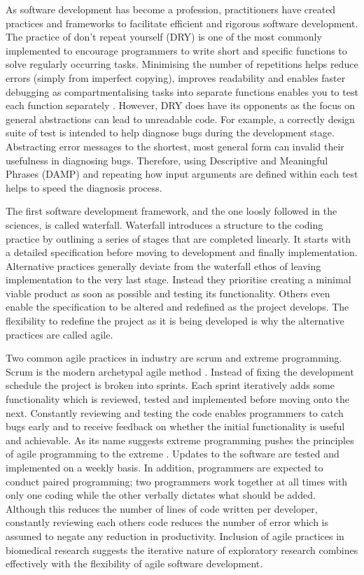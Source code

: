 \documentclass[../main.tex]{subfiles}
\begin{document}

As software development has become a profession, practitioners have created practices and frameworks to facilitate efficient and rigorous software development.
The practice of don't repeat yourself (DRY) is one of the most commonly implemented to encourage programmers to write short and specific functions to solve regularly occurring tasks. 
Minimising the number of repetitions helps reduce errors (simply from imperfect copying), improves readability and enables faster debugging as compartmentalising tasks into separate functions enables you to test each function separately \parencite{Thomas1999}.
However, DRY does have its opponents as the focus on general abstractions can lead to unreadable code.
For example, a correctly design suite of test is intended to help diagnose bugs during the development stage.
Abstracting error messages to the shortest, most general form can invalid their usefulness in diagnosing bugs.
Therefore, using Descriptive and Meaningful Phrases (DAMP) and repeating how input arguments are defined within each test helps to speed the diagnosis process.

The first software development framework, and the one loosly followed in the sciences, is called waterfall.
Waterfall introduces a structure to the coding practice by outlining a series of stages that are completed linearly.
It starts with a detailed specification before moving to development and finally implementation.
Alternative practices generally deviate from the waterfall ethos of leaving implementation to the very last stage.
Instead they prioritise creating a minimal viable product as soon as possible and testing its functionality.
Others even enable the specification to be altered and redefined as the project develops.
The flexibility to redefine the project as it is being developed is why the alternative practices are called agile. 

Two common agile practices in industry are scrum and extreme programming.
Scrum is the modern archetypal agile method \parencite{Schwaber2020}.
Instead of fixing the development schedule the project is broken into sprints.
Each sprint iteratively adds some functionality which is reviewed, tested and implemented before moving onto the next.
Constantly reviewing and testing the code enables programmers to catch bugs early and to receive feedback on whether the initial functionality is useful and achievable.
As its name suggests extreme programming pushes the principles of agile programming to the extreme \parencite{Beck2004}.
Updates to the software are tested and implemented on a weekly basis. 
In addition, programmers are expected to conduct paired programming; 
two programmers work together at all times with only one coding while the other verbally dictates what should be added. 
Although this reduces the number of lines of code written per developer, constantly reviewing each others code reduces the number of error which is assumed to negate any reduction in productivity.
Inclusion of agile practices in biomedical research suggests the iterative nature of exploratory research combines effectively with the flexibility of agile software development\parencite{kane2006}.
\end{document}
